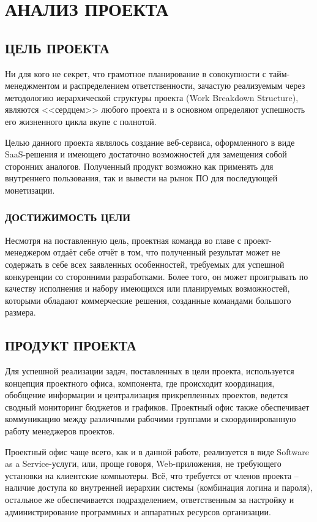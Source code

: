 \documentclass[14pt, a4paper]{extreport}
\begin{document}
\chapter{\MakeTextUppercase{Анализ проекта}}
\section{\MakeTextUppercase{Цель проекта}}

Ни для кого не секрет, что грамотное планирование в совокупности с тайм-менеджментом и распределением ответственности, зачастую реализуемым через методологию иерархической структуры проекта (Work Breakdown Structure), являются <<сердцем>> любого проекта и в основном определяют успешность его жизненного цикла вкупе с полнотой.

Целью данного проекта являлось создание веб-сервиса, оформленного в виде SaaS-решения и имеющего достаточно возможностей для замещения собой сторонних аналогов. Полученный продукт возможно как применять для внутреннего пользования, так и вывести на рынок ПО для последующей монетизации.

\subsection{\MakeTextUppercase{Достижимость цели}}
Несмотря на поставленную цель, проектная команда во главе с проект-менеджером отдаёт себе отчёт в том, что полученный результат может не содержать в себе всех заявленных особенностей, требуемых для успешной конкуренции со сторонними разработками. Более того, он может проигрывать по качеству исполнения и набору имеющихся или планируемых возможностей, которыми обладают коммерческие решения, созданные командами большого размера.
	
	
\section{\MakeTextUppercase{Продукт проекта}}

Для успешной реализации задач, поставленных в цели проекта, используется концепция проектного офиса, компонента, где происходит координация, обобщение информации и централизация прикрепленных проектов, ведется сводный мониторинг бюджетов и графиков. Проектный офис также обеспечивает коммуникацию между различными рабочими группами и скоординированную работу менеджеров проектов.

Проектный офис чаще всего, как и в данной работе, реализуется в виде Software as a Service-услуги, или, проще говоря, Web-приложения, не требующего установки на клиентские компьютеры. Всё, что требуется от членов проекта -- наличие доступа ко внутренней иерархии системы (комбинация логина и пароля), остальное же обеспечивается подразделением, ответственным за настройку и администрирование программных и аппаратных ресурсов организации.
\end{document}
